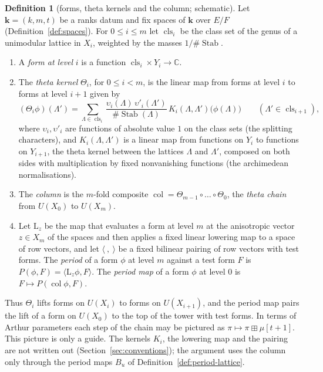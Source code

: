 \documentclass[11pt]{amsbook}
\theoremstyle{plain}
\theoremstyle{definition}
\newtheorem{definition}[theorem]{Definition}
\theoremstyle{remark}
\numberwithin{equation}{section}
\numberwithin{figure}{chapter}
\numberwithin{table}{chapter}
\renewcommand{\C}{\mathbb{C}}
\begin{document}
\begin{definition}[forms, theta kernels and the column; schematic]
\label{def:column}
Let $\mathbf k=(k,m,t)$ be a ranks datum and fix spaces of
$\mathbf k$ over $E/F$ (Definition~\ref{def:spaces}). For $0\le i\le
m$ let $\operatorname{cls}_i$ be the class set of the genus of a
unimodular lattice in $X_i$, weighted by the masses
$1/\#\operatorname{Stab}$.
\begin{enumerate}[label=(\arabic*)]
\item A \emph{form at level} $i$ is a function
$\operatorname{cls}_i\times Y_i\to\C$.
\item The \emph{theta kernel} $\Theta_i$, for $0\le i<m$, is the
linear map from forms at level $i$ to forms at level $i+1$ given by
\[
(\Theta_i\phi)(\Lambda')=\sum_{\Lambda\in\operatorname{cls}_i}
\frac{\upsilon_i(\Lambda)\,\upsilon'_i(\Lambda')}
{\#\operatorname{Stab}(\Lambda)}\,K_i(\Lambda,\Lambda')\bigl(
\phi(\Lambda)\bigr)\qquad(\Lambda'\in\operatorname{cls}_{i+1}),
\]
where $\upsilon_i,\upsilon'_i$ are functions of absolute value $1$ on
the class sets (the splitting characters), and $K_i(\Lambda,\Lambda')$
is a linear map from functions on $Y_i$ to functions on $Y_{i+1}$,
the theta kernel between the lattices $\Lambda$ and $\Lambda'$,
composed on both sides with multiplication by fixed nonvanishing
functions (the archimedean normalisations).
\item The \emph{column} is the $m$-fold composite
$\operatorname{col}=\Theta_{m-1}\circ\dots\circ\Theta_0$, the
\emph{theta chain} from $U(X_0)$ to $U(X_m)$.
\item Let $\mathrm L_z$ be the map that evaluates a form at level $m$
at the anisotropic vector $z\in X_m$ of the spaces and then applies a
fixed linear lowering map to a space of row vectors, and let
$\langle\ ,\ \rangle$ be a fixed bilinear pairing of row vectors with
test forms. The \emph{period} of a form $\phi$ at level $m$ against a
test form $F$ is $P(\phi,F)=\langle\mathrm L_z\phi,F\rangle$. The
\emph{period map} of a form $\phi$ at level $0$ is
$F\mapsto P(\operatorname{col}\phi,F)$.
\end{enumerate}
\end{definition}

\noindent Thus $\Theta_i$ lifts forms on $U(X_i)$ to forms on
$U(X_{i+1})$, and the period map pairs the lift of a form on $U(X_0)$
to the top of the tower with test forms. In terms of Arthur parameters
each step of the chain may be pictured as
$\pi\mapsto\pi\boxplus\mu[t+1]$. This picture is only a guide. The
kernels $K_i$, the lowering map and the pairing are not written out
(Section~\ref{sec:conventions}); the argument uses the column only
through the period maps $B_u$ of Definition~\ref{def:period-lattice}.
\end{document}
